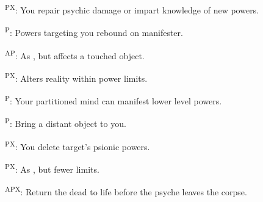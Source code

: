 \begin{enumerate*}
\item {}\textsuperscript{PX}: You repair psychic damage or impart knowledge of new powers. %

      \textsuperscript{P}: Powers targeting you rebound on manifester. %

      \textsuperscript{AP}: As , but affects a touched object.

\item {}\textsuperscript{PX}: Alters reality within power limits. %

      \textsuperscript{P}: Your partitioned mind can manifest lower level powers. %

      \textsuperscript{P}: Bring a distant object to you.

\item {}\textsuperscript{PX}: You delete target's psionic powers. %

      \textsuperscript{PX}: As , but fewer limits. %

      \textsuperscript{APX}: Return the dead to life before the psyche leaves the corpse.
\end{enumerate*}



